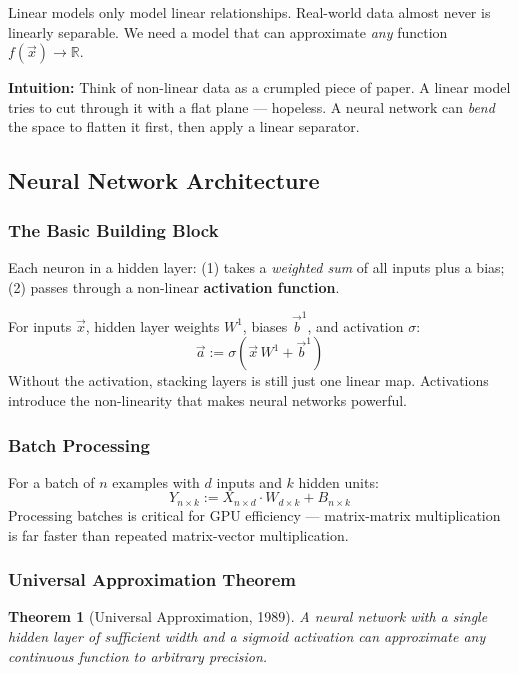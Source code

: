 \documentclass[11pt]{article}
\newtheorem{theorem}{Theorem}
\begin{document}
Linear models only model linear relationships. Real-world data almost never is linearly separable. We need a model that can approximate \emph{any} function $f(\vec{x}) \to \mathbb{R}$.

\begin{takeawaybox}
\textbf{Intuition:} Think of non-linear data as a crumpled piece of paper. A linear model tries to cut through it with a flat plane --- hopeless. A neural network can \emph{bend} the space to flatten it first, then apply a linear separator.
\end{takeawaybox}

\subsection{Neural Network Architecture}

\subsubsection{The Basic Building Block}

Each neuron in a hidden layer: (1) takes a \emph{weighted sum} of all inputs plus a bias; (2) passes through a non-linear \textbf{activation function}.

For inputs $\vec{x}$, hidden layer weights $W^1$, biases $\vec{b}^1$, and activation $\sigma$:
\[
\vec{a} := \sigma\!\left(\vec{x}\,W^1 + \vec{b}^1\right)
\]
Without the activation, stacking layers is still just one linear map. Activations introduce the non-linearity that makes neural networks powerful.

\subsubsection{Batch Processing}

For a batch of $n$ examples with $d$ inputs and $k$ hidden units:
\[
Y_{n \times k} := X_{n \times d} \cdot W_{d \times k} + B_{n \times k}
\]
Processing batches is critical for GPU efficiency --- matrix-matrix multiplication is far faster than repeated matrix-vector multiplication.

\subsubsection{Universal Approximation Theorem}

\begin{theorem}[Universal Approximation, 1989]
A neural network with a single hidden layer of sufficient width and a sigmoid activation can approximate any continuous function to arbitrary precision.
\end{theorem}
\end{document}
